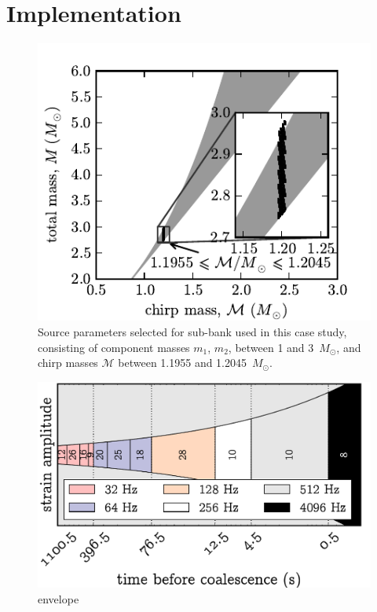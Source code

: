 \documentclass[portrait,plainboxedsections]{sciposter}
\begin{document}
\begin{minipage}[t]{0.25\textwidth}

\section*{Implementation}

\begin{figure}[h]
	\includegraphics[width=\textwidth]{figures/tmpltbank}
	\caption{\label{fig:tmpltbank}Source parameters selected for sub-bank used in this
case study, consisting of component masses $m_1$, $m_2$, between 1 and 3~$M_\odot$, and
chirp masses $\mathcal{M}$ between 1.1955 and 1.2045~$M_\odot$.}
\end{figure}

\begin{figure}
\includegraphics[width=\textwidth]{figures/envelope}
\caption{envelope}
\end{figure}


\end{minipage}
\end{document}
